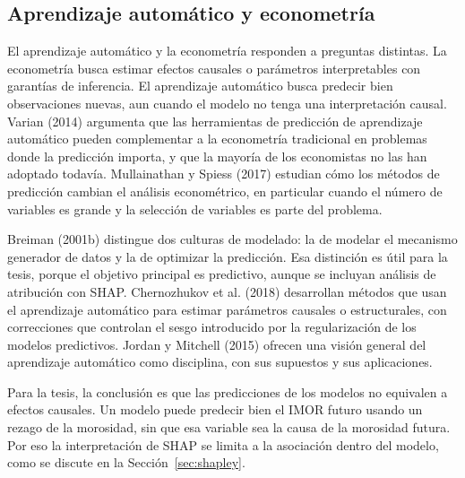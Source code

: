 \subsection{Aprendizaje automático y econometría}
El aprendizaje automático y la econometría responden a preguntas distintas. La econometría busca estimar efectos causales o parámetros interpretables con garantías de inferencia. El aprendizaje automático busca predecir bien observaciones nuevas, aun cuando el modelo no tenga una interpretación causal. Varian (2014) argumenta que las herramientas de predicción de aprendizaje automático pueden complementar a la econometría tradicional en problemas donde la predicción importa, y que la mayoría de los economistas no las han adoptado todavía. Mullainathan y Spiess (2017) estudian cómo los métodos de predicción cambian el análisis econométrico, en particular cuando el número de variables es grande y la selección de variables es parte del problema.

Breiman (2001b) distingue dos culturas de modelado: la de modelar el mecanismo generador de datos y la de optimizar la predicción. Esa distinción es útil para la tesis, porque el objetivo principal es predictivo, aunque se incluyan análisis de atribución con SHAP. Chernozhukov et al. (2018) desarrollan métodos que usan el aprendizaje automático para estimar parámetros causales o estructurales, con correcciones que controlan el sesgo introducido por la regularización de los modelos predictivos. Jordan y Mitchell (2015) ofrecen una visión general del aprendizaje automático como disciplina, con sus supuestos y sus aplicaciones.

Para la tesis, la conclusión es que las predicciones de los modelos no equivalen a efectos causales. Un modelo puede predecir bien el IMOR futuro usando un rezago de la morosidad, sin que esa variable sea la causa de la morosidad futura. Por eso la interpretación de SHAP se limita a la asociación dentro del modelo, como se discute en la Sección~\ref{sec:shapley}.

